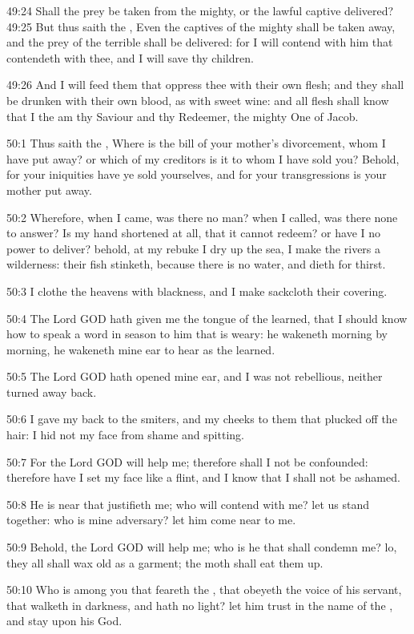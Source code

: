 49:24 Shall the prey be taken from the mighty, or the lawful captive
delivered?  49:25 But thus saith the \LORD, Even the captives of the
mighty shall be taken away, and the prey of the terrible shall be
delivered: for I will contend with him that contendeth with thee, and
I will save thy children.

49:26 And I will feed them that oppress thee with their own flesh; and
they shall be drunken with their own blood, as with sweet wine: and
all flesh shall know that I the \LORD am thy Saviour and thy Redeemer,
the mighty One of Jacob.

50:1 Thus saith the \LORD, Where is the bill of your mother's
divorcement, whom I have put away? or which of my creditors is it to
whom I have sold you?  Behold, for your iniquities have ye sold
yourselves, and for your transgressions is your mother put away.

50:2 Wherefore, when I came, was there no man? when I called, was
there none to answer? Is my hand shortened at all, that it cannot
redeem? or have I no power to deliver? behold, at my rebuke I dry up
the sea, I make the rivers a wilderness: their fish stinketh, because
there is no water, and dieth for thirst.

50:3 I clothe the heavens with blackness, and I make sackcloth their
covering.

50:4 The Lord GOD hath given me the tongue of the learned, that I
should know how to speak a word in season to him that is weary: he
wakeneth morning by morning, he wakeneth mine ear to hear as the
learned.

50:5 The Lord GOD hath opened mine ear, and I was not rebellious,
neither turned away back.

50:6 I gave my back to the smiters, and my cheeks to them that plucked
off the hair: I hid not my face from shame and spitting.

50:7 For the Lord GOD will help me; therefore shall I not be
confounded: therefore have I set my face like a flint, and I know that
I shall not be ashamed.

50:8 He is near that justifieth me; who will contend with me? let us
stand together: who is mine adversary? let him come near to me.

50:9 Behold, the Lord GOD will help me; who is he that shall condemn
me?  lo, they all shall wax old as a garment; the moth shall eat them
up.

50:10 Who is among you that feareth the \LORD, that obeyeth the voice
of his servant, that walketh in darkness, and hath no light? let him
trust in the name of the \LORD, and stay upon his God.

